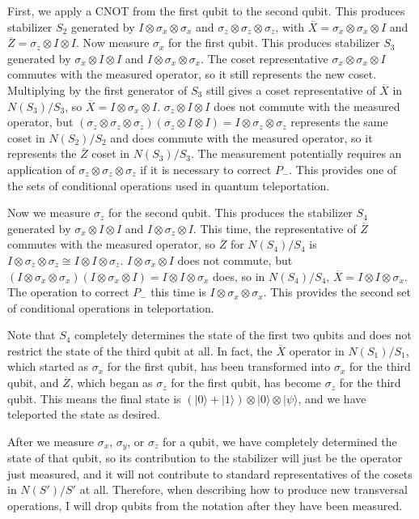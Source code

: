 \documentclass{report}
\newcommand{\ket}[1]{|{#1}\rangle}
\newcommand{\X}{\sigma_x}
\newcommand{\Z}{\sigma_z}
\newcommand{\Y}{\sigma_y}
\newcommand{\Xbar}{\overline{X}}
\newcommand{\Zbar}{\overline{Z}}
\begin{document}
First, we apply a CNOT from the first qubit to the second qubit.  This 
produces stabilizer $S_2$ generated by $I \otimes \X \otimes \X$ and $\Z 
\otimes \Z \otimes \Z$, with $\Xbar = \X \otimes \X \otimes I$ and $\Zbar 
= \Z \otimes I \otimes I$.  Now measure $\X$ for the first qubit.  This 
produces stabilizer $S_3$ generated by $\X \otimes I \otimes I$ and $I 
\otimes \X \otimes \X$.  The coset representative $\X \otimes \X \otimes 
I$ commutes with the measured operator, so it still represents the new 
coset.  Multiplying by the first generator of $S_3$ still gives a coset 
representative of $\Xbar$ in $N(S_3)/S_3$, so $\Xbar = I \otimes \X 
\otimes I$.  $\Z \otimes I \otimes I$ does not commute with the measured 
operator, but $(\Z \otimes \Z \otimes \Z) (\Z \otimes I \otimes I) = I 
\otimes \Z \otimes \Z$ represents the same coset in $N(S_2)/S_2$ and 
does commute with the measured operator, so it represents the $\Zbar$ 
coset in $N(S_3)/S_3$.  The measurement potentially requires an application 
of $\Z \otimes \Z \otimes \Z$ if it is necessary to correct $P_-$.  This 
provides one of the sets of conditional operations used in quantum 
teleportation.

Now we measure $\Z$ for the second qubit.  This produces the stabilizer 
$S_4$ generated by $\X \otimes I \otimes I$ and $I \otimes \Z \otimes I$.  
This time, the representative of $\Zbar$ commutes with the measured 
operator, so $\Zbar$ for $N(S_4)/S_4$ is $I \otimes \Z \otimes \Z \cong I 
\otimes I \otimes \Z$.  $I \otimes \X \otimes I$ does not commute, but $(I 
\otimes \X \otimes \X) (I \otimes \X \otimes I) = I \otimes I \otimes \X$ 
does, so in $N(S_4)/S_4$, $\Xbar = I \otimes I \otimes \X$.  The operation 
to correct $P_-$ this time is $I \otimes \X \otimes \X$.  This provides the 
second set of conditional operations in teleportation.

Note that $S_4$ completely determines the state of the first two qubits and 
does not restrict the state of the third qubit at all.  In fact, the $\Xbar$ 
operator in $N(S_1)/S_1$, which started as $\X$ for the first qubit, has 
been transformed into $\X$ for the third qubit, and $\Zbar$, which began 
as $\Z$ for the first qubit, has become $\Z$ for the third qubit.  This means 
the final state is $(\ket{0} + \ket{1}) \otimes \ket{0} \otimes \ket{\psi}$, 
and we have teleported the state as desired.

After we measure $\X$, $\Y$, or $\Z$ for a qubit, we have completely 
determined the state of that qubit, so its contribution to the stabilizer will 
just be the operator just measured, and it will not contribute to standard 
representatives of the cosets in $N(S')/S'$ at all.  Therefore, when 
describing how to produce new transversal operations, I will drop qubits 
from the notation after they have been measured.
\end{document}

